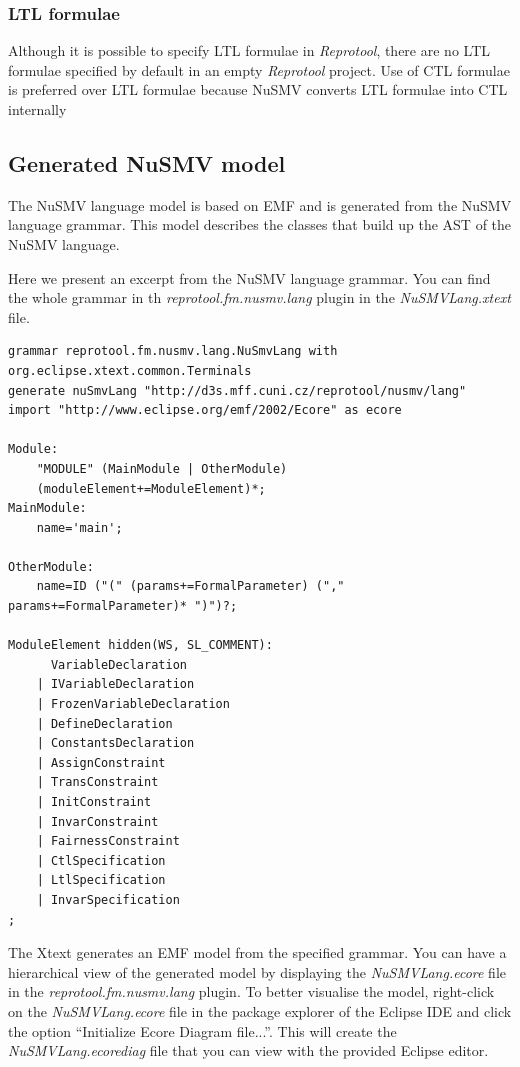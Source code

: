 \subsubsection{LTL formulae}
Although it is possible to specify \ac{LTL} formulae in \emph{Reprotool}, there are no \ac{LTL} formulae specified by default in an empty
\emph{Reprotool} project. Use of \ac{CTL} formulae is preferred over \ac{LTL} formulae because NuSMV converts \ac{LTL} formulae into \ac{CTL} internally
\cite{NuSMV-ltl-fmsd97}

\subsection{Generated NuSMV model}

The NuSMV language model is based on \ac{EMF} and is generated from the NuSMV language grammar.
This model describes the classes that build up the \ac{AST} of the NuSMV language.

Here we present an excerpt from the NuSMV language grammar. You can find the whole grammar in th
\emph{reprotool.fm.nusmv.lang} plugin in the \emph{NuSMVLang.xtext} file.

\begin{lstlisting}[language=XtextGrammar]
grammar reprotool.fm.nusmv.lang.NuSmvLang with org.eclipse.xtext.common.Terminals
generate nuSmvLang "http://d3s.mff.cuni.cz/reprotool/nusmv/lang"
import "http://www.eclipse.org/emf/2002/Ecore" as ecore

Module:
	"MODULE" (MainModule | OtherModule)
	(moduleElement+=ModuleElement)*;
MainModule:
	name='main';

OtherModule:
	name=ID ("(" (params+=FormalParameter) ("," params+=FormalParameter)* ")")?;

ModuleElement hidden(WS, SL_COMMENT):
	  VariableDeclaration
	| IVariableDeclaration
	| FrozenVariableDeclaration
	| DefineDeclaration
	| ConstantsDeclaration
	| AssignConstraint
	| TransConstraint
	| InitConstraint
	| InvarConstraint
	| FairnessConstraint
	| CtlSpecification
	| LtlSpecification
	| InvarSpecification
;
\end{lstlisting}

The Xtext generates an \ac{EMF} model from the specified grammar.
You can have a hierarchical view of the generated model by displaying the \emph{NuSMVLang.ecore} file in the \emph{reprotool.fm.nusmv.lang} plugin.
To better visualise the model, right-click on the \emph{NuSMVLang.ecore} file in the package explorer of the Eclipse IDE and click the option ``Initialize Ecore Diagram file...''.
This will create the \emph{NuSMVLang.ecorediag} file that you can view with the provided Eclipse editor.

